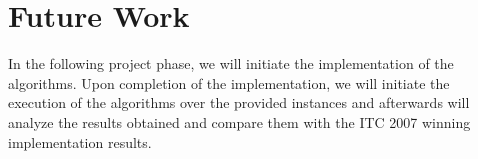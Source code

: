 \chapter{Future Work}
\label{future-work}
\thispagestyle{plain}
In the following project phase, we will initiate the implementation of the algorithms. Upon completion of the implementation, we will initiate the execution of the algorithms over the provided instances and afterwards will analyze the results obtained and compare them with the ITC 2007 winning implementation results.\\
